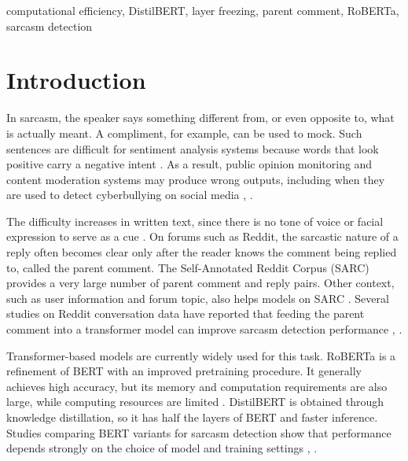 \documentclass[conference]{IEEEtran}
\begin{document}
\begin{IEEEkeywords}
computational efficiency, DistilBERT, layer freezing, parent comment, RoBERTa, sarcasm detection
\end{IEEEkeywords}

\section{Introduction}
In sarcasm, the speaker says something different from, or even opposite to, what is actually meant. A compliment, for example, can be used to mock. Such sentences are difficult for sentiment analysis systems because words that look positive carry a negative intent \cite{prakash2025sarcasm}. As a result, public opinion monitoring and content moderation systems may produce wrong outputs, including when they are used to detect cyberbullying on social media \cite{dhumpati2025sarcasm}, \cite{grover2026emoji}.

The difficulty increases in written text, since there is no tone of voice or facial expression to serve as a cue \cite{jimenez2026bert}. On forums such as Reddit, the sarcastic nature of a reply often becomes clear only after the reader knows the comment being replied to, called the parent comment. The Self-Annotated Reddit Corpus (SARC) \cite{khodak2018sarc} provides a very large number of parent comment and reply pairs. Other context, such as user information and forum topic, also helps models on SARC \cite{hao2023enhanced}. Several studies on Reddit conversation data have reported that feeding the parent comment into a transformer model can improve sarcasm detection performance \cite{ataeii2020transformers}, \cite{dubey2025unpacking}.

Transformer-based models are currently widely used for this task. RoBERTa \cite{liu2019roberta} is a refinement of BERT with an improved pretraining procedure. It generally achieves high accuracy, but its memory and computation requirements are also large, while computing resources are limited \cite{treviso2023efficient}. DistilBERT \cite{sanh2019distilbert} is obtained through knowledge distillation, so it has half the layers of BERT and faster inference. Studies comparing BERT variants for sarcasm detection show that performance depends strongly on the choice of model and training settings \cite{jimenez2026bert}, \cite{ullah2026advanced}.
\end{document}
